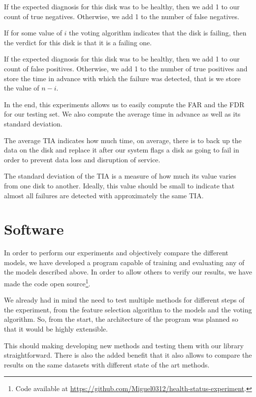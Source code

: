 If the expected diagnosis for this disk was to be healthy, then we add 1 to our count of true negatives.
Otherwise, we add 1 to the number of false negatives.

If for some value of $i$ the voting algorithm indicates that the disk is failing, then the verdict for this disk is that it is a failing one.

If the expected diagnosis for this disk was to be healthy, then we add 1 to our count of false positives.
Otherwise, we add 1 to the number of true positives and store the time in advance with which the failure was detected, that is we store the value of $n-i$.

In the end, this experiments allows us to easily compute the FAR and the FDR for our testing set.
We also compute the average time in advance as well as its standard deviation.

The average TIA indicates how much time, on average, there is to back up the data on the disk and replace it after our system flags a disk as going to fail in order to prevent data loss and disruption of service. 

The standard deviation of the TIA is a measure of how much its value varies from one disk to another.
Ideally, this value should be small to indicate that almost all failures are detected with approximately the same TIA.

\section{Software}

In order to perform our experiments and objectively compare the different models, we have developed a program capable of training and evaluating any of the models described above.
In order to allow others to verify our results, we have made the code open source\footnote{Code available at \url{https://github.com/Miguel0312/health-status-experiment}.}.

We already had in mind the need to test multiple methods for different steps of the experiment, from the feature selection algorithm to the models and the voting algorithm.
So, from the start, the architecture of the program was planned so that it would be highly extensible.

This should making developing new methods and testing them with our library straightforward.
There is also the added benefit that it also allows to compare the results on the same datasets with different state of the art methods.

